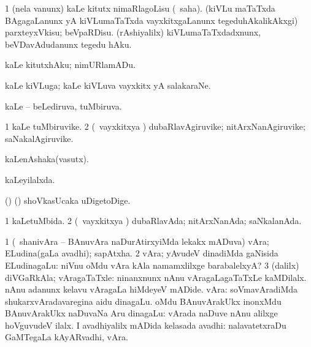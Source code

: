 \bentry
{} 
\gl{\sakirx}
\expl{}
\bmng
\bnum
\num{1} (nela \mo vanunx) kaLe kitutx nimaRlagoLisu (\rUpa\ saha). 
\banum
{} (kiVLu maTaTxda BAgagaLanunx yA kiVLumaTaTxda vayxkitxgaLanunx tegeduhAkalikAkxgi) parxteyxVkisu; beVpaRDisu. 
 (rAshiyalilx) kiVLumaTaTxdadxnunx, beVDavAdudanunx tegedu hAku. 
\eanum
\numie
\enum
\emng

\noindent 
\gl{\akirx}
\expl{}
\bmng
kaLe kitutxhAku; nimURlamADu. 
\emng
\eentry

\bentry
{} 
\gl{\nA}
\expl{}
\bmng
kaLe kiVLuga; kaLe kiVLuva vayxkitx yA salakaraNe. 
\emng
\eentry

\bentry
{} 
\gl{\gu}
\expl{}
\bmng
kaLe -- beLediruva, tuMbiruva. 
\emng
\eentry

\bentry
{} 
\gl{\nA}
\expl{}
\bmng
\bnum
\num{1} kaLe tuMbiruvike. 
\num{2} (\kanmu\ vayxkitxya \vi) dubaRlavAgiruvike; nitArxNanAgiruvike; saNakalAgiruvike. 
\enum
\emng
\eentry

\bentry
{} 
\gl{\nA}
\expl{}
\bmng
kaLenAshaka(vasutx). 
\emng
\eentry

\bentry
{} 
\gl{\gu}
\expl{}
\bmng
kaLeyilalxda. 
\emng
\eentry

\bentry
{} 
\gl{\nA}
\expl{}
\bmng
(\bava) (\pArxparx) shoVkasUcaka uDigetoDige. 
\emng
\eentry

\bentry
{} 
\gl{\gu}
\bmng
\bnum
\num{1} kaLetuMbida. 
\num{2} (\kanmu\ vayxkitxya \vi) dubaRlavAda; nitArxNanAda; saNkalanAda. 
\enum
\emng
\eentry

\bentry
{} 
\gl{\nA}
\expl{}
\bmng
\bnum
\num{1} (\sA\ shanivAra -- BAnuvAra naDurAtirxyiMda lekakx mADuva) vAra; ELudina(gaLa avadhi); sapAtxha. 
\num{2} vAra; yAvudeV dinadiMda gaNisida ELudinagaLu:  niVnu oMdu vAra kAla namamxlilxge barabalelxyA? 
\num{3} (\bava dalilx) diVGaRkAla; vAragaTaTxle:  ninanxnunx nAnu vAragaLagaTaTxLe kaMDilalx.  nAnu adanunx kelavu vAragaLa hiMdeyeV mADide. 
 vAra: 
\banum
{} soVmavAradiMda shukarxvAradavaregina aidu dinagaLu. 
 oMdu BAnuvArakUkx inonxMdu BAnuvArakUkx naDuvaNa Aru dinagaLu:  vArada naDuve nAnu alilxge hoVguvudeV ilalx. 
 I avadhiyalilx mADida kelasada avadhi:  nalavatetxraDu GaMTegaLa kAyARvadhi, vAra. 
\eanum
\numie
\enum
\emng

